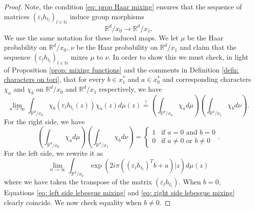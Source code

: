 \documentclass[reqno,11pt, twoside]{amsart}
\theoremstyle{plain}
\theoremstyle{definition}
\theoremstyle{definition}
\theoremstyle{remark}
\numberwithin{equation}{section}
\newcommand{\R}{{\mathbb{R}}}
\newcommand{\N}{{\mathbb{N}}}
\newcommand{\bR}{\mathbb{R}}
\begin{document}
\begin{proof}
    Note, the condition \eqref{eq: prop Haar mixing} ensures that the sequence of matrices $(\varepsilon_l h_{t_l})_{l \in \N}$ induce group morphisms
    \begin{equation*}
        \R^d/x_0 \to \R^d/x_1.
    \end{equation*}  
    We use the same notation for these induced maps.
    We let $\mu$ be the Haar probability on $\R^d/x_0$, $\nu$ be the Haar probability on $\R^d/x_1$ and claim that the sequence $(\varepsilon_l h_{t_l})_{l \in \N}$ mixes $\mu$ to $\nu$.
    In order to show this we must check, in light of Proposition \ref{prop: mixing functions} and the comments in Definition \ref{defn: characters on tori}, that for every $b \in x_1^*$ and $a \in x_0^*$ and corresponding characters $\chi_a$ and $\chi_b$ on $\R^d/x_0$ and $\R^d/x_1$ respectively, we have
    \begin{equation}\label{eq: full measure mixing-1}
        \lim_{n \to \infty } \int_{\bR^d/x_0}  \chi_b(\varepsilon_l h_{t_l} (z)) \chi_a(z) d\mu(z) \overset{\mathrm{?}}{=} \left(\int_{\bR^d/x_0} \chi_a d\mu \right) \left(\int_{\bR^d/x_1} \chi_b d\nu\right).
    \end{equation}
    For the right side, we have
    \begin{equation}\label{eq: left side lebesgue mixing}
        \left(\int_{\bR^d/x_0} \chi_a d\mu \right) \left(\int_{\bR^d/x_1} \chi_b d\nu\right) =
        \begin{cases}
			1 & \text{if } a =0 \text{ and } b =0 \\
            0 & \text{if } a\neq 0\text{ or } b \neq 0
		  \end{cases}.
    \end{equation}
    For the left side, we rewrite it as
    \begin{equation}\label{eq: right side lebesgue mixing}
        \lim_{n \to \infty } \int_{\bR^d/x_0}  \exp( 2i\pi ((\varepsilon_l h_{t_l})^T b + a)| z) d\mu(z)
    \end{equation}
    where we have taken the transpose of the matrix $(\varepsilon_l h_{t_l})$.
    When $b=0$, Equations \eqref{eq: left side lebesgue mixing} and \eqref{eq: right side lebesgue mixing} clearly coincide.
    We now check equality when $b\neq 0$. 


\end{proof}
\end{document}
